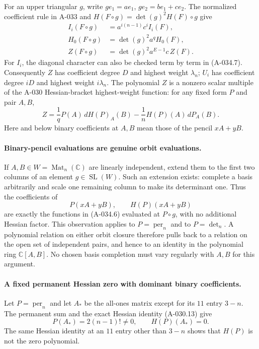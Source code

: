 For an upper triangular \(g\), write
\(ge_1=a e_1\), \(ge_2=b e_1+c e_2\).
The normalized coefficient rule in A-033 and
\(H(F\circ g)=\det(g)^2H(F)\circ g\) give
\[
 \begin{split}
 I_i(F\circ g)&=a^{i(n-1)}c^i I_i(F),\\
 H_0(F\circ g)&=\det(g)^2a^q H_0(F),\\
 Z(F\circ g)&=\det(g)^2a^{E-1}c\,Z(F).
 \end{split}                                                   \tag{A-034.9}
\]
For \(I_i\), the diagonal character can also be checked
term by term in (A-034.7).
Consequently \(Z\) has coefficient degree \(D\) and
highest weight \(\lambda_n\); \(U_i\) has coefficient degree
\(iD\) and highest weight \(i\lambda_n\).
The polynomial \(Z\) is a nonzero scalar multiple of the
A-030 Hessian-bracket highest-weight function:
for any fixed form \(P\) and pair \(A,B\),
\[
 Z=\frac1q P(A)\,dH(P)_A(B)
                   -\frac1n H(P)(A)\,dP_A(B).                 \tag{A-034.10}
\]
Here and below binary coefficients at \(A,B\) mean those
of the pencil \(xA+yB\).

\paragraph{Binary-pencil evaluations are genuine orbit evaluations.}
If \(A,B\in W=\operatorname{Mat}_n(\mathbb C)\) are linearly
independent, extend them to the first two columns of an
element \(g\in\operatorname{SL}(W)\).
Such an extension exists: complete a basis arbitrarily and
scale one remaining column to make its determinant one.
Thus the coefficients of
\[
 P(xA+yB),\qquad H(P)(xA+yB)
\]
are exactly the functions in (A-034.6) evaluated at
\(P\circ g\), with no additional Hessian factor.
This observation applies to \(P=\operatorname{per}_n\) and
to \(P=\det_n\).
A polynomial relation on either orbit closure therefore
pulls back to a relation on the open set of independent
pairs, and hence to an identity in the polynomial ring
\(\mathbb C[A,B]\). No chosen basis completion must vary
regularly with \(A,B\) for this argument.

\paragraph{A fixed permanent Hessian zero with dominant binary coefficients.}
Let \(P=\operatorname{per}_n\) and let \(A_*\) be the
all-ones matrix except for its \(11\) entry \(3-n\).
The permanent sum and the exact Hessian identity (A-030.13)
give
\[
        P(A_*)=2(n-1)!\ne0,\qquad H(P)(A_*)=0.                 \tag{A-034.11}
\]
The same Hessian identity at an \(11\) entry other than
\(3-n\) shows that \(H(P)\) is not the zero polynomial.


